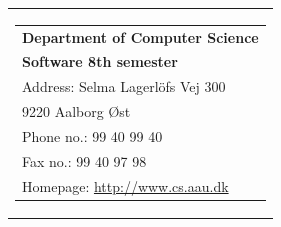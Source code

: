 {}
\thispagestyle{empty}

    \begin{tabular}{r}
        \parbox{\textwidth}{ %
         \hfill \parbox{4.9cm}{ %
            \begin{tabular}{l} 
                {\textsf{\small{\textbf{Department of Computer Science}}}}\\
                {\textsf{\small{\textbf{Software 8th semester}}}}\\
                {\textsf{\small{Address: Selma Lagerlöfs Vej 300}}} \\
                {\textsf{\small{\hspace{14 mm} 9220 Aalborg Øst }}} \\
                {\textsf{\small{Phone no.: 99 40 99 40}}} \\
                {\textsf{\small{Fax no.: 99 40 97 98}}} \\
                {\textsf{\small{Homepage: \url{http://www.cs.aau.dk}}}}
            \end{tabular}}}
    \end{tabular}
    
